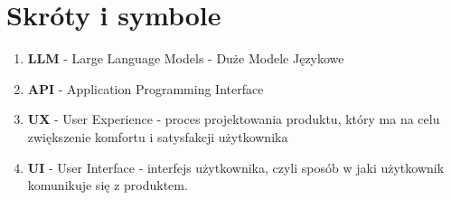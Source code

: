 \section{Skróty i symbole}

 \begin{enumerate}

    \item {\bf LLM} - Large Language Models - Duże Modele Językowe
    \item {\bf API} - Application Programming Interface
    \item {\bf UX} - User Experience - proces projektowania produktu, który ma na celu zwiększenie komfortu i satysfakcji użytkownika
    \item {\bf UI} - User Interface - interfejs użytkownika, czyli sposób w jaki użytkownik komunikuje się z produktem.
     
 \end{enumerate}